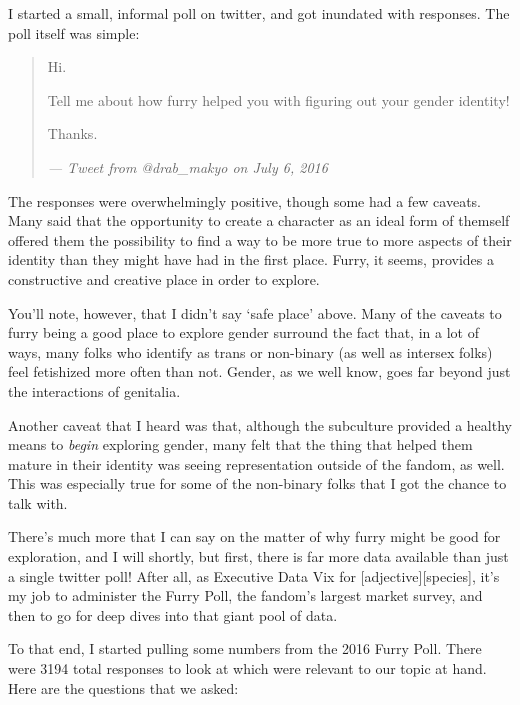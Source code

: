 I started a small, informal poll on twitter, and got inundated with responses.  The poll itself was simple:

\begin{quotation}
  Hi.

  Tell me about how furry helped you with figuring out your gender identity!

  Thanks.

  \textit{--- Tweet from @drab\_makyo on July 6, 2016}
\end{quotation}

The responses were overwhelmingly positive, though some had a few caveats.  Many said that the opportunity to create a character as an ideal form of themself offered them the possibility to find a way to be more true to more aspects of their identity than they might have had in the first place.  Furry, it seems, provides a constructive and creative place in order to explore.

You'll note, however, that I didn't say `safe place' above.  Many of the caveats to furry being a good place to explore gender surround the fact that, in a lot of ways, many folks who identify as trans or non-binary (as well as intersex folks) feel fetishized more often than not.  Gender, as we well know, goes far beyond just the interactions of genitalia.

Another caveat that I heard was that, although the subculture provided a healthy means to \textit{begin} exploring gender, many felt that the thing that helped them mature in their identity was seeing representation outside of the fandom, as well.  This was especially true for some of the non-binary folks that I got the chance to talk with.

There's much more that I can say on the matter of why furry might be good for exploration, and I will shortly, but first, there is far more data available than just a single twitter poll!  After all, as Executive Data Vix for [adjective][species], it's my job to administer the Furry Poll, the fandom's largest market survey, and then to go for deep dives into that giant pool of data.

To that end, I started pulling some numbers from the 2016 Furry Poll.  There were 3194 total responses to look at which were relevant to our topic at hand.  Here are the questions that we asked:

